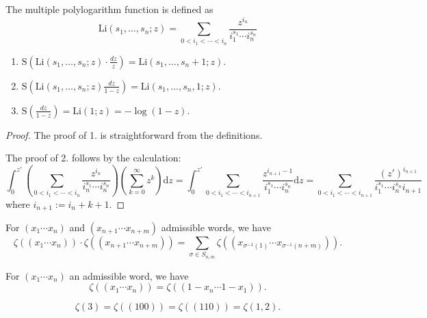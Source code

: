 \begin{defn}
The multiple polylogarithm function is defined as
\[
\mathrm{Li}(s_1, \ldots, s_n; z) = \sum_{0 < i_1 < \cdots < i_n} \frac{z^{i_n}}{i_1^{s_1} \cdots i_n^{s_n}}
\]
\end{defn}

\begin{lemma}\label{lem:Li}
\begin{enumerate}
\item $\mathrm{S}(\mathrm{Li}(s_1, \ldots, s_n; z) \cdot \frac{dz}{z}) = \mathrm{Li}(s_1, \ldots, s_n + 1; z)$.
\item $\mathrm{S}(\mathrm{Li}(s_1, \ldots, s_n; z) \frac{dz}{1-z}) = \mathrm{Li}(s_1, \ldots, s_n, 1; z)$.
\item $\mathrm{S}(\frac{dz}{1-z}) = \mathrm{Li}(1; z) = -\log(1-z)$.
\end{enumerate}
\end{lemma}
\begin{proof}
The proof of 1. is straightforward from the definitions.

The proof of 2. follows by the calculation:
\[
\int_0^{z'} \left( \sum_{0 < i_1 < \cdots < i_n} \frac{z^{i_n}}{i_n^{s_1} \cdots i_n^{s_n}} \right) \left( \sum_{k=0}^{\infty} z^k \right) \mathrm{d}z = \int_0^{z'} \sum_{0 < i_1 < \cdots < i_{n+1}} \frac{z^{i_{n+1}-1}}{i_1^{s_1} \cdots i_n^{s_n}}\mathrm{d}z = \sum_{0 < i_1 < \cdots < i_{n+1}} \frac{(z')^{i_{n+1}}}{i_1^{s_1} \cdots i_n^{s_n} i_{n+1}}
\]
where $i_{n+1} := i_n + k + 1$.
\end{proof}

\begin{cor}\label{hoermannshuffle}
For $(x_1 \cdots x_n)$ and $(x_{n+1} \cdots x_{n+m})$ admissible words, we have
\[ \zeta((x_1 \cdots x_n)) \cdot \zeta((x_{n+1} \cdots x_{n+m})) =  \sum_{\sigma \in S_{n,m}} \zeta((x_{\sigma^{-1}(1)} \cdots x_{\sigma^{-1}(n+m)})). \]
\end{cor}

\begin{cor}
For $(x_1 \cdots x_n)$ an admissible word, we have
\[ \zeta((x_1 \cdots x_n)) = \zeta((1-x_n \cdots 1-x_1)). \]
\end{cor}

\begin{exam}
\[ \zeta(3) = \zeta((100)) = \zeta((110)) = \zeta(1,2). \]
\end{exam}

